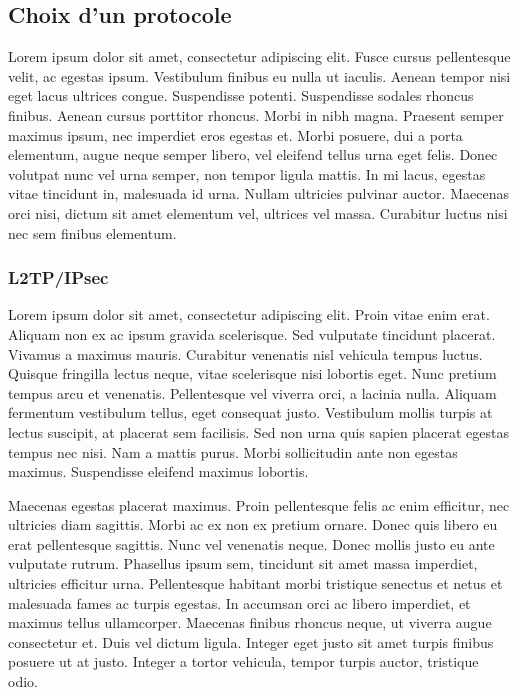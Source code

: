 \documentclass{report}
\begin{document}
\subsection{Choix d'un protocole}

Lorem ipsum dolor sit amet, consectetur adipiscing elit. Fusce cursus pellentesque velit, ac egestas ipsum. Vestibulum finibus eu nulla ut iaculis. Aenean tempor nisi eget lacus ultrices congue. Suspendisse potenti. Suspendisse sodales rhoncus finibus. Aenean cursus porttitor rhoncus. Morbi in nibh magna. Praesent semper maximus ipsum, nec imperdiet eros egestas et. Morbi posuere, dui a porta elementum, augue neque semper libero, vel eleifend tellus urna eget felis. Donec volutpat nunc vel urna semper, non tempor ligula mattis. In mi lacus, egestas vitae tincidunt in, malesuada id urna. Nullam ultricies pulvinar auctor. Maecenas orci nisi, dictum sit amet elementum vel, ultrices vel massa. Curabitur luctus nisi nec sem finibus elementum.

 
\subsubsection{L2TP/IPsec}

Lorem ipsum dolor sit amet, consectetur adipiscing elit. Proin vitae enim erat. Aliquam non ex ac ipsum gravida scelerisque. Sed vulputate tincidunt placerat. Vivamus a maximus mauris. Curabitur venenatis nisl vehicula tempus luctus. Quisque fringilla lectus neque, vitae scelerisque nisi lobortis eget. Nunc pretium tempus arcu et venenatis. Pellentesque vel viverra orci, a lacinia nulla. Aliquam fermentum vestibulum tellus, eget consequat justo. Vestibulum mollis turpis at lectus suscipit, at placerat sem facilisis. Sed non urna quis sapien placerat egestas tempus nec nisi. Nam a mattis purus. Morbi sollicitudin ante non egestas maximus. Suspendisse eleifend maximus lobortis.

Maecenas egestas placerat maximus. Proin pellentesque felis ac enim efficitur, nec ultricies diam sagittis. Morbi ac ex non ex pretium ornare. Donec quis libero eu erat pellentesque sagittis. Nunc vel venenatis neque. Donec mollis justo eu ante vulputate rutrum. Phasellus ipsum sem, tincidunt sit amet massa imperdiet, ultricies efficitur urna. Pellentesque habitant morbi tristique senectus et netus et malesuada fames ac turpis egestas. In accumsan orci ac libero imperdiet, et maximus tellus ullamcorper. Maecenas finibus rhoncus neque, ut viverra augue consectetur et. Duis vel dictum ligula. Integer eget justo sit amet turpis finibus posuere ut at justo. Integer a tortor vehicula, tempor turpis auctor, tristique odio.
\\
\\
\end{document}
